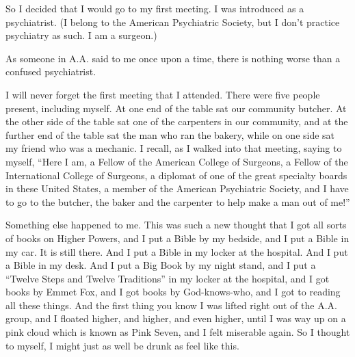 \begin{biblechapter}
\verse So I decided that I would go to my first meeting.
\verse I was introduced as a psychiatrist.
\verse (I belong to the American Psychiatric Society, 
    but I don’t practice psychiatry as such.
    I am a surgeon.)

\verse As someone in A.A. said to me once upon a time, 
    there is nothing worse than a confused psychiatrist.

\verse I will never forget the first meeting that I attended.
\verse There were five people present, including myself.
\verse At one end of the table sat our community butcher.
\verse At the other side of the table 
    sat one of the carpenters in our community, 
    and at the further end of the table sat the man who ran the bakery, 
    while on one side sat my friend who was a mechanic.
\verse I recall, as I walked into that meeting, saying to myself, 
    “Here I am, a Fellow of the American College of Surgeons, 
    a Fellow of the International College of Surgeons, 
    a diplomat of one of the great specialty boards in these United States, 
    a member of the American Psychiatric Society, 
    and I have to go to the butcher, 
    the baker and the carpenter 
    to help make a man out of me!”

\verse Something else happened to me.
\verse This was such a new thought that 
    I got all sorts of books on Higher Powers, 
    and I put a Bible by my bedside, 
    and I put a Bible in my car.
\verse It is still there.
\verse And I put a Bible in my locker at the hospital.
\verse And I put a Bible in my desk.
\verse And I put a Big Book by my night stand, 
    and I put a “Twelve Steps and Twelve Traditions” 
    in my locker at the hospital, 
    and I got books by Emmet Fox, 
    and I got books by God-knows-who, 
    and I got to reading all these things.
\verse And the first thing you know 
    I was lifted right out of the A.A. group, 
    and I floated higher, and higher, and even higher, 
    until I was way up on a pink cloud which is known as Pink Seven, 
    and I felt miserable again.
\verse So I thought to myself, 
    I might just as well be drunk as feel like this.


\end{biblechapter}
